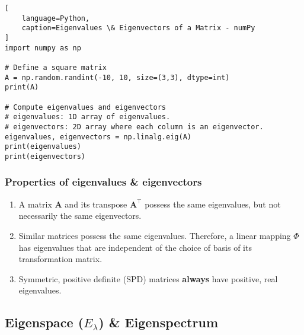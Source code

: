 \begin{lstlisting}[
    language=Python,
    caption=Eigenvalues \& Eigenvectors of a Matrix - numPy
]
import numpy as np

# Define a square matrix
A = np.random.randint(-10, 10, size=(3,3), dtype=int)
print(A)

# Compute eigenvalues and eigenvectors
# eigenvalues: 1D array of eigenvalues.
# eigenvectors: 2D array where each column is an eigenvector.
eigenvalues, eigenvectors = np.linalg.eig(A)
print(eigenvalues)
print(eigenvectors)
\end{lstlisting}



\subsubsection{Properties of eigenvalues \& eigenvectors}

\begin{enumerate}
    \item A matrix $\bm{A}$ and its transpose $\bm{A}^\top$ possess the same eigenvalues, but not necessarily the same eigenvectors.
    \hfill \cite{mfml/book/mml/Deisenroth-Faisal-Ong}

    \item Similar matrices possess the same eigenvalues.
    Therefore, a linear mapping $\Phi$ has eigenvalues that are independent of the choice of basis of its transformation matrix.
    \hfill \cite{mfml/book/mml/Deisenroth-Faisal-Ong}

    \item Symmetric, positive definite (SPD) matrices \textbf{always} have positive, real eigenvalues.
    \hfill \cite{mfml/book/mml/Deisenroth-Faisal-Ong}
\end{enumerate}




\subsection{Eigenspace ($E_\lambda $) \& Eigenspectrum}

